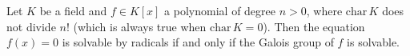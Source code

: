 Let $K$ be a field and $f \in K[x]$ a polynomial of degree $n > 0$, where $\mathrm{char}\,K$ does not divide $n!$ (which is always true when $\mathrm{char}\,K = 0$). Then the equation $f(x) = 0$ is solvable by radicals if and only if the Galois group of $f$ is solvable.
